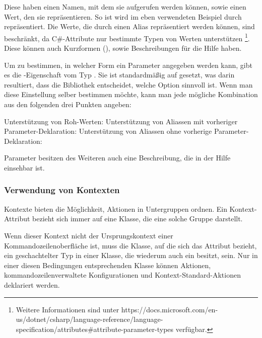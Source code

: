 Diese haben einen Namen, mit dem sie aufgerufen werden können, sowie einen Wert, den sie repräsentieren.
So ist wird im eben verwendeten Beispiel  durch  repräsentiert.
Die Werte, die durch einen Alias repräsentiert werden können, sind beschränkt, da C\#-Attribute nur bestimmte Typen von Werten unterstützen
\footnote{Weitere Informationen sind unter https://docs.microsoft.com/en-us/dotnet/csharp/language-reference/language-specification/attributes\#attribute-parameter-types verfügbar.}.
Diese können auch Kurzformen (), sowie Beschreibungen für die Hilfe haben.

Um zu bestimmen, in welcher Form ein Parameter angegeben werden kann, gibt es die -Eigenschaft vom Typ .
Sie ist standardmäßig auf  gesetzt, was darin resultiert, dass die Bibliothek entscheidet, welche Option sinnvoll ist.
Wenn man diese Einstellung selber bestimmen möchte, kann man jede mögliche Kombination aus den folgenden drei Punkten angeben:
\begin{outline}
 \1 Unterstützung von Roh-Werten: 
 \1 Unterstützung von Aliassen mit vorheriger Parameter-Deklaration: 
 \1 Unterstützung von Aliassen ohne vorherige Parameter-Deklaration: 
\end{outline}

Parameter besitzen des Weiteren auch eine Beschreibung, die in der Hilfe einsehbar ist.

\subsubsection{Verwendung von Kontexten}
Kontexte bieten die Möglichkeit, Aktionen in Untergruppen ordnen.
Ein Kontext-Attribut bezieht sich immer auf eine Klasse, die eine solche Gruppe darstellt.

Wenn dieser Kontext nicht der Ursprungskontext einer Kommandozeilenoberfläche ist, 
muss die Klasse, auf die sich das Attribut bezieht, ein geschachtelter Typ in einer Klasse, die wiederum auch ein  besitzt, sein.
Nur in einer diesen Bedingungen entsprechenden Klasse können Aktionen, kommandozeilenverwaltete Konfigurationen und Kontext-Standard-Aktionen deklariert werden.


